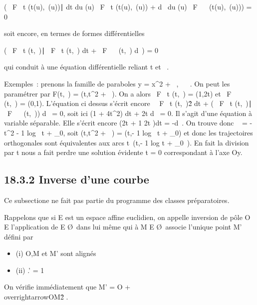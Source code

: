 \documentclass[]{article}
\begin{document}
\left ( \partial~F \over \partial~t
(t(u),\lambda~(u))∣ dt \over du
(u) \partial~F \over \partial~t (t(u),\lambda~(u)) + d\lambda~
\over du (u) \partial~F \over \partial~\lambda~
(t(u),\lambda~(u))\right ) = 0

soit encore, en termes de formes différentielles

\left ( \partial~F \over \partial~t
(t,\lambda~)∣ \partial~F \over \partial~t (t,\lambda~)
dt + \partial~F \over \partial~\lambda~ (t,\lambda~) d\lambda~\right ) = 0

qui conduit à une équation différentielle reliant t et \lambda~.

Exemples~: prenons la famille de paraboles y = x^2 + \lambda~, \lambda~ \in
{}~. On peut les paramétrer par F(t,\lambda~) = (t,t^2 + \lambda~). On a
alors  \partial~F \over \partial~t (t,\lambda~) = (1,2t) et  \partial~F
\over \partial~\lambda~ (t,\lambda~) = (0,1). L'équation ci dessus s'écrit
encore \ \partial~F \over \partial~t
(t,\lambda~)\^2 dt + \left
( \partial~F \over \partial~t (t,\lambda~)∣ \partial~F
\over \partial~\lambda~ (t,\lambda~)\right ) d\lambda~ = 0, soit ici
(1 + 4t^2) dt + 2t d\lambda~ = 0. Il s'agit d'une équation à
variable séparable. Elle s'écrit encore (2t + 1 \over
2t )dt = -d\lambda~. On trouve donc \lambda~ = -t^2 - 1
  log~
t + \lambda_0, soit (t,t^2 + \lambda~) =
(t,- 1   log~
t + \lambda_0) et donc les trajectoires
orthogonales sont équivalentes aux arcs
t\mapsto~(t,- 1 
 log t + \lambda_0~). En fait la division
par t nous a fait perdre une solution évidente t = 0 correspondant à
l'axe Oy.

\subsection{18.3.2 Inverse d'une courbe}

Ce subsectione ne fait pas partie du programme des classes préparatoires.

Rappelons que si E est un espace affine euclidien, on appelle inversion
de pôle O \in E l'application de E \diagdown\O\
dans lui même qui à M \in E \diagdown\O\ associe
l'unique point M' défini par

\begin{itemize}
\itemsep1pt\parskip0pt
\item
  (i) O,M et M' sont alignés
\item
  (ii) \overlineOM.\overlineOM' =
  1
\end{itemize}

On vérifie immédiatement que M' = O +
\overrightarrowOM \over
\\overrightarrowOM\^2
.
\end{document}
